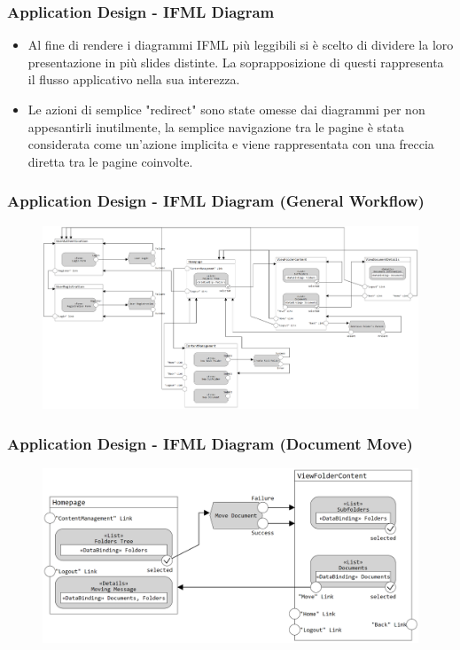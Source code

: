 \documentclass[aspectratio=169]{beamer}
\begin{document}
\begin{frame}
    \frametitle{Application Design - IFML Diagram}
    \begin{itemize}
        \item Al fine di rendere i diagrammi IFML più leggibili si è scelto di dividere la loro presentazione in
              più slides distinte. La soprapposizione di questi rappresenta il flusso applicativo nella sua interezza.
        \item Le azioni di semplice "redirect" sono state omesse dai diagrammi per non appesantirli inutilmente,
              la semplice navigazione tra le pagine è stata considerata come un'azione implicita e viene rappresentata
              con una freccia diretta tra le pagine coinvolte.
    \end{itemize}
\end{frame}

\begin{frame}
    \frametitle{Application Design - IFML Diagram (General Workflow)}
    \begin{figure}
        \centering
        \includegraphics[width=1\linewidth]{Resources/IFMLs/images/IFML - Navigation.png}
    \end{figure}
\end{frame}

\begin{frame}
    \frametitle{Application Design - IFML Diagram (Document Move)}
    \begin{figure}
        \centering
        \includegraphics[width=0.9\linewidth]{Resources/IFMLs/images/IFML - Document Move.png}
    \end{figure}
\end{frame}
\end{document}
